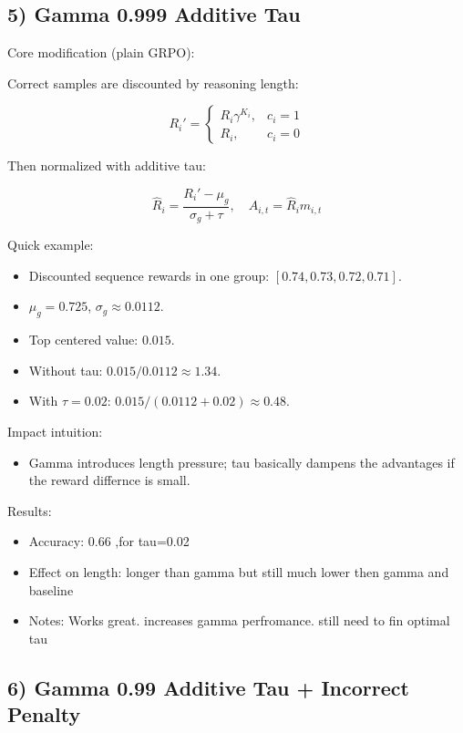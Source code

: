 \documentclass[
]{article}
\providecommand{\tightlist}{%
  \setlength{\itemsep}{0pt}\setlength{\parskip}{0pt}}
\begin{document}
\subsection{5) Gamma 0.999 Additive Tau}\label{gamma-0.999-additive-tau}

Core modification (plain GRPO):

Correct samples are discounted by reasoning length:

\[
R_i' =
\begin{cases}
R_i\gamma^{K_i}, & c_i=1 \\
R_i, & c_i=0
\end{cases}
\]

Then normalized with additive tau:

\[
\hat{R}_i = \frac{R_i'-\mu_g}{\sigma_g+\tau}, \quad
A_{i,t}=\hat{R}_i m_{i,t}
\]

Quick example:

\begin{itemize}
\tightlist
\item
  Discounted sequence rewards in one group: \([0.74,0.73,0.72,0.71]\).
\item
  \(\mu_g=0.725\), \(\sigma_g\approx0.0112\).
\item
  Top centered value: \(0.015\).
\item
  Without tau: \(0.015/0.0112\approx1.34\).
\item
  With \(\tau=0.02\): \(0.015/(0.0112+0.02)\approx0.48\).
\end{itemize}

Impact intuition:

\begin{itemize}
\tightlist
\item
  Gamma introduces length pressure; tau basically dampens the advantages
  if the reward differnce is small.
\end{itemize}

Results:

\begin{itemize}
\tightlist
\item
  Accuracy: 0.66 ,for tau=0.02
\item
  Effect on length: longer than gamma but still much lower then gamma
  and baseline
\item
  Notes: Works great. increases gamma perfromance. still need to fin
  optimal tau
\end{itemize}

\subsection{6) Gamma 0.99 Additive Tau + Incorrect
Penalty}\label{gamma-0.99-additive-tau-incorrect-penalty}
\end{document}
